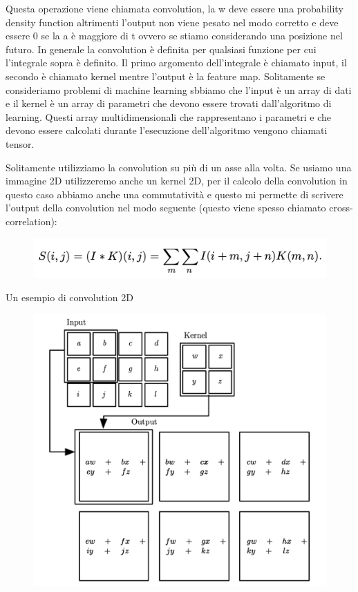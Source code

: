 \documentclass[14pt]{extreport}
\begin{document}
Questa operazione viene chiamata convolution, la w deve essere una probability density function altrimenti l'output non
viene pesato nel modo corretto e deve essere 0 se la a è maggiore di t ovvero se stiamo considerando una posizione nel futuro.
In generale la convolution è definita per qualsiasi funzione per cui l'integrale sopra è definito.
Il primo argomento dell'integrale è chiamato input, il secondo è chiamato kernel mentre l'output è la feature map.
Solitamente se consideriamo problemi di machine learning sbbiamo che l'input è un array di dati e il kernel è un array di parametri 
che devono essere trovati dall'algoritmo di learning. Questi array multidimensionali che rappresentano i parametri e che devono essere calcolati
durante l'esecuzione dell'algoritmo vengono chiamati tensor.

Solitamente utilizziamo la convolution su più di un asse alla volta.
Se usiamo una immagine 2D utilizzeremo anche un kernel 2D, per il calcolo della convolution in questo caso 
abbiamo anche una commutatività e questo mi permette di scrivere l'output della convolution nel modo seguente (questo
viene spesso chiamato cross-correlation):

\begin{figure}[H]
	\centering
	\includegraphics[width=0.7\linewidth]{410.jpeg}
	\end{figure}

Un esempio di convolution 2D
\begin{figure}[H]
	\centering
	\includegraphics[width=0.7\linewidth]{409.jpeg}
	\end{figure}
\end{document}
